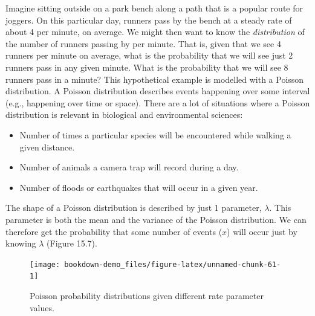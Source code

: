 \documentclass[
]{scrbook}
\providecommand{\tightlist}{%
  \setlength{\itemsep}{0pt}\setlength{\parskip}{0pt}}
\begin{document}
Imagine sitting outside on a park bench along a path that is a popular route for joggers.
On this particular day, runners pass by the bench at a steady rate of about 4 per minute, on average.
We might then want to know the \emph{distribution} of the number of runners passing by per minute.
That is, given that we see 4 runners per minute on average, what is the probability that we will see just 2 runners pass in any given minute.
What is the probability that we will see 8 runners pass in a minute?
This hypothetical example is modelled with a Poisson distribution.
A Poisson distribution describes events happening over some interval (e.g., happening over time or space).
There are a lot of situations where a Poisson distribution is relevant in biological and environmental sciences:

\begin{itemize}
\tightlist
\item
  Number of times a particular species will be encountered while walking a given distance.
\item
  Number of animals a camera trap will record during a day.
\item
  Number of floods or earthquakes that will occur in a given year.
\end{itemize}

The shape of a Poisson distribution is described by just 1 parameter, \(\lambda\).
This parameter is both the mean and the variance of the Poisson distribution.
We can therefore get the probability that some number of events (\(x\)) will occur just by knowing \(\lambda\) (Figure 15.7).

\begin{figure}
\texttt{[image: bookdown-demo\_files/figure-latex/unnamed-chunk-61-1]} \caption{Poisson probability distributions given different rate parameter values.}\label{fig:unnamed-chunk-61}
\end{figure}
\end{document}
